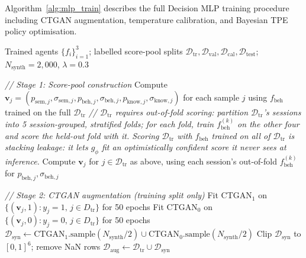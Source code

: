 \documentclass[journal]{IEEEtran}
\begin{document}
Algorithm~\ref{alg:mlp_train} describes the full Decision MLP training
procedure including CTGAN augmentation, temperature calibration, and
Bayesian TPE policy optimisation.

\begin{algorithm}[h]
\caption{Decision MLP training with CTGAN augmentation and Bayesian TPE}
\label{alg:mlp_train}
\begin{algorithmic}[1]
\Require Trained agents $\{f_i\}_{i=1}^{3}$;
  labelled score-pool splits
  $\mathcal{D}_{\text{tr}}, \mathcal{D}_{\text{val}}, \mathcal{D}_{\text{cal}},
   \mathcal{D}_{\text{test}}$;
  $N_{\text{synth}}{=}2{,}000$, $\lambda{=}0.3$

\State \textit{// Stage 1: Score-pool construction}
  \State Compute $\mathbf{v}_j = (p_{\text{sem},j}, \sigma_{\text{sem},j},
    p_{\text{beh},j}, \sigma_{\text{beh},j}, p_{\text{know},j},
    \sigma_{\text{know},j})$ for each sample $j$ using $f_{\text{beh}}$
    trained on the full $\mathcal{D}_{\text{tr}}$
\EndFor
\State \textit{// $\mathcal{D}_{\text{tr}}$ requires out-of-fold scoring: partition
  $\mathcal{D}_{\text{tr}}$'s sessions into 5 session-grouped, stratified folds;
  for each fold, train $f_{\text{beh}}^{(k)}$ on the other four and score the
  held-out fold with it. Scoring $\mathcal{D}_{\text{tr}}$ with $f_{\text{beh}}$
  trained on all of $\mathcal{D}_{\text{tr}}$ is stacking leakage: it lets
  $g_\phi$ fit an optimistically confident score it never sees at inference.}
\State Compute $\mathbf{v}_j$ for $j \in \mathcal{D}_{\text{tr}}$ as above,
  using each session's out-of-fold $f_{\text{beh}}^{(k)}$ for
  $p_{\text{beh},j}, \sigma_{\text{beh},j}$

\State \textit{// Stage 2: CTGAN augmentation (training split only)}
\State Fit CTGAN$_1$ on $\{(\mathbf{v}_j, 1) : y_j{=}1,\, j \in D_{\text{tr}}\}$
  for 50 epochs
\State Fit CTGAN$_0$ on $\{(\mathbf{v}_j, 0) : y_j{=}0,\, j \in D_{\text{tr}}\}$
  for 50 epochs
\State $\mathcal{D}_{\text{syn}} \gets
  \text{CTGAN}_1.\text{sample}(N_{\text{synth}}/2) \cup
  \text{CTGAN}_0.\text{sample}(N_{\text{synth}}/2)$
\State Clip $\mathcal{D}_{\text{syn}}$ to $[0,1]^6$; remove NaN rows
\State $\mathcal{D}_{\text{aug}} \gets \mathcal{D}_{\text{tr}} \cup \mathcal{D}_{\text{syn}}$


\end{algorithmic}
\end{algorithm}
\end{document}
